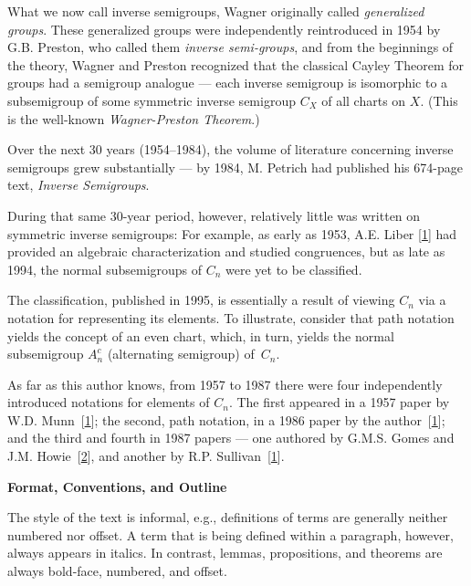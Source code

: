 \documentclass{surv-l}
\numberwithin{equation}{section}
\numberwithin{table}{section}
\numberwithin{figure}{section}
\theoremstyle{definition}
\begin{document}
What we now call inverse semigroups, Wagner originally called
\emph{generalized groups}. These
generalized groups were independently reintroduced in 1954 by G.B.
Preston, who called them \emph{inverse
semi-groups}, and from the beginnings
of the theory, Wagner and Preston recognized that the classical
Cayley Theorem for groups had a semigroup
analogue
--- each inverse semigroup is isomorphic to a subsemigroup of some
symmetric inverse semigroup $C_{X}$ of all charts on $X$. (This is
the well-known \emph{Wagner-Preston Theorem}.)

Over the next 30 years (1954--1984), the volume of literature
concerning inverse semigroups grew substantially --- by 1984, M.
Petrich had published his 674-page text, \emph{Inverse
Semigroups}.

During that same 30-year period, however, relatively little was
written on symmetric inverse semigroups: For example, as early as
1953, A.E. Liber
[\hyperlink{bib72}{1}] had provided an algebraic
characterization and studied congruences, but as late as 1994, the
normal subsemigroups of $C_{n}$ were yet to be classified.

The classification, published in 1995, is essentially a result of
viewing $C_{n}$ via a notation for representing its elements. To
illustrate, consider that path notation yields the concept of an
even chart, which, in turn, yields the normal subsemigroup
$A_{n}^{c}$ (alternating semigroup) of~$C_{n}$.

As far as this author knows, from 1957 to 1987 there were four
independently introduced notations for elements of $C_{n}$. The
first appeared in a 1957 paper by W.D. Munn~[\hyperlink{bib54}{1}]; the second, path notation,
in a 1986 paper by the author~[\hyperlink{bib37}{1}]; and
the third and fourth in 1987 papers --- one authored by G.M.S.
Gomes and J.M. Howie~[\hyperlink{bib22a}{2}], and another by R.P.
Sullivan~[\hyperlink{bib72}{1}].

\begin{center}
\textbf{Format, Conventions, and Outline}
\end{center}

The style of the text is informal, e.g., definitions of terms are
generally neither numbered nor offset. A term that is being
defined within a paragraph, however, always appears in italics. In
contrast, lemmas, propositions, and theorems are always bold-face,
numbered, and offset.
\end{document}

